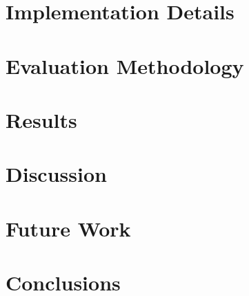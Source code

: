 \documentclass[a4paper,12pt]{article}
\begin{document}
\section{Implementation Details}
\label{sec:adaptations-impl}


\newpage

\section{Evaluation Methodology}
\label{sec:evaluation}


\newpage

\section{Results}
\label{sec:results}


\newpage

\section{Discussion}
\label{sec:discussion}


\newpage

\section{Future Work}
\label{sec:future-work}


\newpage

\section{Conclusions}
\label{sec:conclusions}


\newpage


%


%
\end{document}
